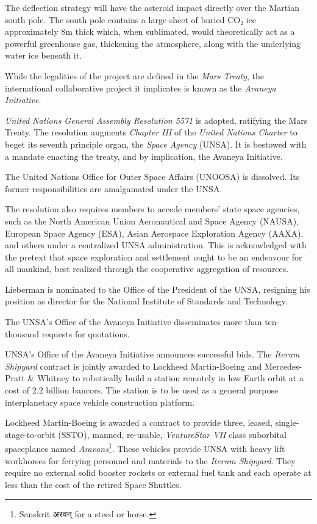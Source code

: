 The deflection strategy will have the asteroid impact directly over the Martian south pole. The south pole contains a large sheet of buried CO₂ ice approximately 8m thick which, when sublimated, would theoretically act as a powerful greenhouse gas, thickening the atmosphere, along with the underlying water ice beneath it.

While the legalities of the project are defined in the {\it Mars Treaty}, the international collaborative project it implicates is known as the {\it Avaneya Initiative}.
\StopTimelineDate

{\it United Nations General Assembly Resolution 5571} is adopted, ratifying the Mars Treaty. The resolution augments {\it Chapter III} of the {\it United Nations Charter} to beget its seventh principle organ, the {\it Space Agency} (UNSA). It is bestowed with a mandate enacting the treaty, and by implication, the Avaneya Initiative.

The United Nations Office for Outer Space Affairs (UNOOSA) is dissolved. Its former responsibilities are amalgamated under the UNSA.

The resolution also requires members to accede members' state space agencies, such as the North American Union Aeronautical and Space Agency (NAUSA), European Space Agency (ESA), Asian Aerospace Exploration Agency (AAXA), and others under a centralized UNSA administration. This is acknowledged with the pretext that space exploration and settlement ought to be an endeavour for all mankind, best realized through the cooperative aggregation of resources.

Lieberman is nominated to the Office of the President of the UNSA, resigning his position as director for the National Institute of Standards and Technology.
\StopTimelineDate

The UNSA's Office of the Avaneya Initiative disseminates more than ten-thousand requests for quotations.
\StopTimelineDate

UNSA's Office of the Avaneya Initiative announces successful bids. The {\it Iterum Shipyard} contract is jointly awarded to Lockheed Martin-Boeing and Mercedes-Pratt & Whitney to robotically build a station remotely in low Earth orbit at a cost of 2.2 billion bancors. The station is to be used as a general purpose interplanetary space vehicle construction platform.

Lockheed Martin-Boeing is awarded a contract to provide three, leased, single-stage-to-orbit (SSTO), manned, re-usable, {\it VentureStar VII} class suborbital spaceplanes named {\it Aravans}\footnote{Sanskrit अरवन् for a steed or horse.}. These vehicles provide UNSA with heavy lift workhorses for ferrying personnel and materials to the {\it Iterum Shipyard}. They require no external solid booster rockets or external fuel tank and each operate at less than  the cost of the retired Space Shuttles.

